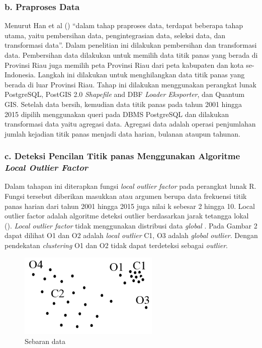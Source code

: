 \subsubsection*{b. Praproses Data}
Menurut Han et al (\citeyear{Han2012}) “dalam tahap praproses data, terdapat beberapa tahap utama, yaitu pembersihan data, pengintegrasian data, seleksi data, dan transformasi data”. Dalam penelitian ini dilakukan pembersihan dan transformasi data. Pembersihan data dilakukan untuk memilih data titik panas yang berada di Provinsi Riau juga memilih peta Provinsi Riau dari peta kabupaten dan kota se-Indonesia. Langkah ini dilakukan untuk menghilangkan data titik panas yang berada di luar Provinsi Riau. Tahap ini dilakukan menggunakan perangkat lunak PostgreSQL, PostGIS 2.0 \textit{Shapefile} and DBF \textit{Loader Eksporter}, dan Quantum GIS.
Setelah data bersih, kemudian data titik panas pada tahun 2001 hingga 2015 dipilih  menggunakan queri pada DBMS PostgreSQL dan dilakukan transformasi data yaitu agregasi data. Agregasi data adalah operasi penjumlahan jumlah kejadian titik panas menjadi data harian, bulanan ataupun tahunan. 

\subsubsection*{c. Deteksi Pencilan Titik panas Menggunakan Algoritme \textit{Local Outlier Factor}}
Dalam tahapan ini diterapkan fungsi \textit{local outlier factor} pada perangkat lunak R. Fungsi tersebut diberikan masukkan atau argumen berupa data frekuensi titik panas harian dari tahun 2001 hingga 2015 juga nilai k sebesar 2 hingga 10. 
Local outlier factor  adalah algoritme deteksi outlier berdasarkan jarak tetangga lokal  (\cite{Beunig2010}). \textit{Local outlier factor} tidak menggunakan distribusi data \textit{global} . Pada Gambar 2 dapat dilihat O1 dan O2 adalah \textit{local outlier} C1, O3 adalah \textit{global outlier}. Dengan pendekatan \textit{clustering} O1 dan O2 tidak dapat terdeteksi sebagai \textit{outlier}.



\begin{figure}[h!] %
	\centering
	\includegraphics[width=190pt]{sebaranTitik.png}
	\caption{Sebaran data}
	\label{fig:sebaranTitik}
\end{figure}

